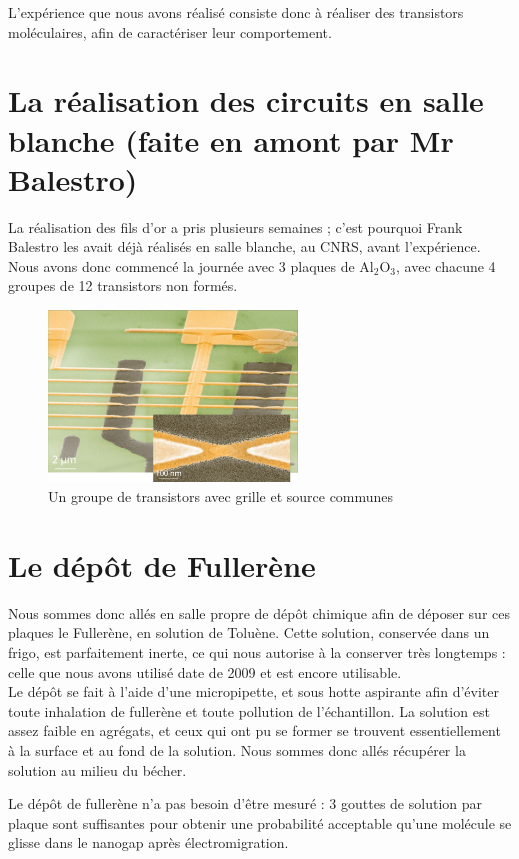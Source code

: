 L'expérience que nous avons réalisé consiste donc à réaliser des transistors moléculaires, afin de caractériser leur comportement.
\section{La réalisation des circuits en salle blanche (faite en amont par Mr Balestro)}
La réalisation des fils d'or a pris plusieurs semaines ; c'est pourquoi Frank Balestro les avait déjà réalisés en salle blanche, au CNRS, avant l'expérience.
Nous avons donc commencé la journée avec 3 plaques de Al$_2$O$_3$, avec chacune 4 groupes de 12 transistors non formés.
\begin{figure}[h]
    \begin{center}
        \includegraphics[width=250px]{Images/GroupeDeTransistors}
        \caption{Un groupe de transistors avec grille et source communes}
        \label{fig:}
    \end{center}
\end{figure}
\section{Le dépôt de Fullerène}
Nous sommes donc allés en salle propre de dépôt chimique afin de déposer sur ces plaques le Fullerène, en solution de Toluène.
Cette solution, conservée dans un frigo, est parfaitement inerte, ce qui nous autorise à la conserver très longtemps : celle que nous avons utilisé date de 2009 et est encore utilisable.\\

Le dépôt se fait à l'aide d'une micropipette, et sous hotte aspirante afin d'éviter toute inhalation de fullerène et toute pollution de l'échantillon.
La solution est assez faible en agrégats, et ceux qui ont pu se former se trouvent essentiellement à la surface et au fond de la solution. Nous sommes donc allés récupérer la solution au milieu du bécher.

Le dépôt de fullerène n'a pas besoin d'être mesuré : 3 gouttes de solution par plaque sont suffisantes pour obtenir une probabilité acceptable qu'une molécule se glisse dans le nanogap après électromigration.

